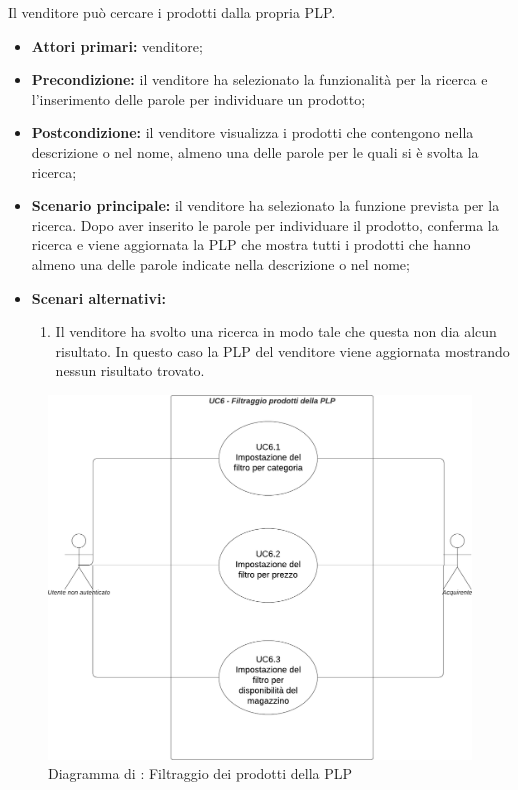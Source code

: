 Il venditore può cercare i prodotti dalla propria PLP.
\begin{itemize}
	\item \textbf{Attori primari:} venditore;
	\item \textbf{Precondizione:} il venditore ha selezionato la funzionalità per la ricerca e l'inserimento delle parole per individuare un prodotto;
	\item \textbf{Postcondizione:} il venditore visualizza i prodotti che contengono nella descrizione o nel nome, almeno una delle parole per le quali si è svolta la ricerca;
	\item \textbf{Scenario principale:} il venditore ha selezionato la funzione prevista per la ricerca. Dopo aver inserito le parole per individuare il prodotto, conferma la ricerca e viene aggiornata la PLP che mostra tutti i prodotti che hanno almeno una delle parole indicate nella descrizione o nel nome;
	\item \textbf{Scenari alternativi:}
	\begin{enumerate}[label=\lett]
		\item Il venditore ha svolto una ricerca in modo tale che questa non dia alcun risultato. In questo caso la PLP del venditore viene aggiornata mostrando nessun risultato trovato.
	\end{enumerate}
\end{itemize}


\begin{figure}[H]
	\centering
	\includegraphics[scale=0.5]{Immagini/DiagrammiUC/UC6FiltraggioProdottiDellaPLP.png}
	\caption{Diagramma di \actualUC: Filtraggio dei prodotti della PLP} 
\end{figure}

